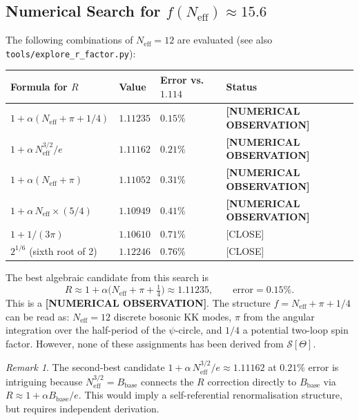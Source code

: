 \documentclass[11pt,a4paper]{article}
\theoremstyle{remark}
\newtheorem{remark}{Remark}
\begin{document}
\subsection{Numerical Search for $f(N_{\mathrm{eff}}) \approx 15.6$}

The following combinations of $N_{\mathrm{eff}} = 12$ are evaluated
(see also \texttt{tools/explore\_r\_factor.py}):

\begin{center}
\begin{tabular}{llll}
  \toprule
  Formula for $R$ & Value & Error vs.\ $1.114$ & Status \\
  \midrule
  $1 + \alpha(N_{\mathrm{eff}} + \pi + 1/4)$
    & $1.11235$ & $0.15\%$ & \textbf{[NUMERICAL OBSERVATION]} \\
  $1 + \alpha\,N_{\mathrm{eff}}^{3/2}/e$
    & $1.11162$ & $0.21\%$ & \textbf{[NUMERICAL OBSERVATION]} \\
  $1 + \alpha(N_{\mathrm{eff}} + \pi)$
    & $1.11052$ & $0.31\%$ & \textbf{[NUMERICAL OBSERVATION]} \\
  $1 + \alpha\,N_{\mathrm{eff}} \times (5/4)$
    & $1.10949$ & $0.41\%$ & \textbf{[NUMERICAL OBSERVATION]} \\
  $1 + 1/(3\pi)$
    & $1.10610$ & $0.71\%$ & [CLOSE] \\
  $2^{1/6}$ (sixth root of 2)
    & $1.12246$ & $0.76\%$ & [CLOSE] \\
  \bottomrule
\end{tabular}
\end{center}

The best algebraic candidate from this search is
\begin{equation}
  R \approx 1 + \alpha\bigl(N_{\mathrm{eff}} + \pi + \tfrac{1}{4}\bigr)
    \approx 1.11235,
  \qquad \text{error} = 0.15\%.
  \label{eq:R_best_candidate}
\end{equation}
This is a \textbf{[NUMERICAL OBSERVATION]}.  The structure
$f = N_{\mathrm{eff}} + \pi + 1/4$ can be read as: $N_{\mathrm{eff}} = 12$
discrete bosonic KK modes, $\pi$ from the angular integration over the
half-period of the $\psi$-circle, and $1/4$ a potential two-loop spin
factor.  However, none of these assignments has been derived from
$\mathcal{S}[\Theta]$.

\begin{remark}
  The second-best candidate $1 + \alpha\,N_{\mathrm{eff}}^{3/2}/e \approx 1.11162$
  at $0.21\%$ error is intriguing because $N_{\mathrm{eff}}^{3/2} = B_{\mathrm{base}}$
  connects the $R$ correction directly to $B_{\mathrm{base}}$ via
  $R \approx 1 + \alpha B_{\mathrm{base}}/e$.
  This would imply a self-referential renormalisation structure, but
  requires independent derivation.
\end{remark}
\end{document}
